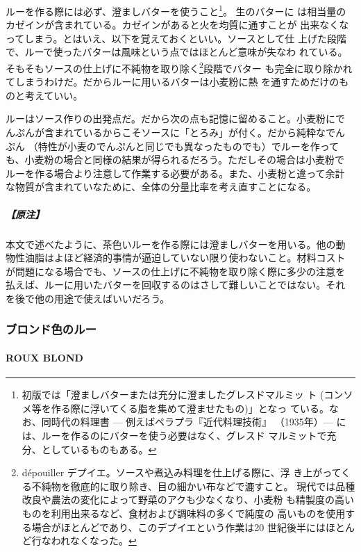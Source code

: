 \begin{recette}
ルーを作る際には必ず、澄ましバターを使うこと\footnote{初版では「澄ましバターまたは充分に澄ましたグレスドマルミッ
  ト (コンソメ等を作る際に浮いてくる脂を集めて澄ませたもの)」となっ
  ている。なお、同時代の料理書 --- 例えばペラプラ『近代料理技術』
  （1935年）--- には、ルーを作るのにバターを使う必要はなく、グレスド
  マルミットで充分、としているものもある。}。 生のバターに
は相当量のカゼインが含まれている。カゼインがあると火を均質に通すことが
出来なくなってしまう。とはいえ、以下を覚えておくといい。ソースとして仕
上げた段階で、ルーで使ったバターは風味という点ではほとんど意味が失なわ
れている。そもそもソースの仕上げに不純物を取り除く\footnote{dépouiller
  デプイエ。ソースや煮込み料理を仕上げる際に、浮
  き上がってくる不純物を徹底的に取り除き、目の細かい布などで漉すこと。
  現代では品種改良や農法の変化によって野菜のアクも少なくなり、小麦粉
  も精製度の高いものを利用出来るなど、食材および調味料の多くで純度の
  高いものを使用する場合がほとんどであり、このデプイエという作業は20
  世紀後半にはほとんど行なわれなくなった。}段階でバター
も完全に取り除かれてしまうわけだ。だからルーに用いるバターは小麦粉に熱
を通すためだけのものと考えていい。

ルーはソース作りの出発点だ。だから次の点も記憶に留めること。小麦粉にで
んぷんが含まれているからこそソースに「とろみ」が付く。だから純粋なでん
ぷん （特性が小麦のでんぷんと同じでも異なったものでも）でルーを作って
も、小麦粉の場合と同様の結果が得られるだろう。ただしその場合は小麦粉で
ルーを作る場合より注意して作業する必要がある。また、小麦粉と違って余計
な物質が含まれていなために、全体の分量比率を考え直すことになる。

\hypertarget{ux539fux6ce8-6}{%
\subparagraph{【原注】}\label{ux539fux6ce8-6}}

本文で述べたように、茶色いルーを作る際には澄ましバターを用いる。他の動
物性油脂はよほど経済的事情が逼迫していない限り使わないこと。材料コスト
が問題になる場合でも、ソースの仕上げに不純物を取り除く際に多少の注意を
払えば、ルーに用いたバターを回収するのはさして難しいことではない。それ
を後で他の用途で使えばいいだろう。

\maeaki

\hypertarget{roux-blond}{%
\subsubsection{ブロンド色のルー}\label{roux-blond}}

\hypertarget{roux-blond-1}{%
\paragraph{ROUX BLOND}\label{roux-blond-1}}


\end{recette}
